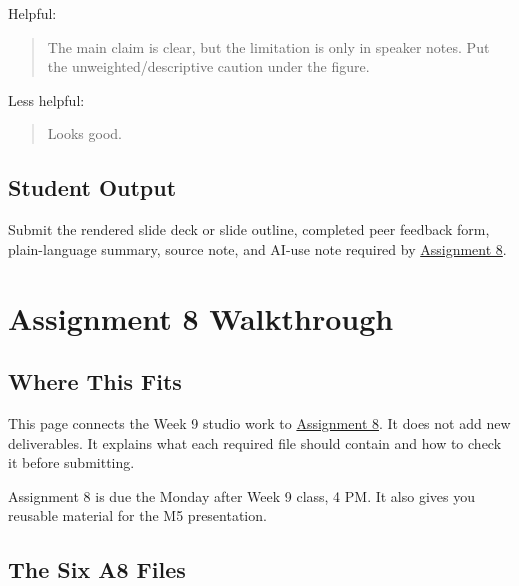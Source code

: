 \documentclass[
  letterpaper,
  DIV=11,
  numbers=noendperiod,
  oneside]{scrreprt}
\begin{document}
Helpful:

\begin{quote}
The main claim is clear, but the limitation is only in speaker notes.
Put the unweighted/descriptive caution under the figure.
\end{quote}

Less helpful:

\begin{quote}
Looks good.
\end{quote}

\section*{Student Output}\label{student-output-7}


Submit the rendered slide deck or slide outline, completed peer feedback
form, plain-language summary, source note, and AI-use note required by
\href{../../assignments/assignment08-communication/README.md}{Assignment
8}.

\chapter*{Assignment 8 Walkthrough}\label{assignment-8-walkthrough}


\section*{Where This Fits}\label{where-this-fits-20}


This page connects the Week 9 studio work to
\href{../../assignments/assignment08-communication/README.md}{Assignment
8}. It does not add new deliverables. It explains what each required
file should contain and how to check it before submitting.

Assignment 8 is due the Monday after Week 9 class, 4 PM. It also gives
you reusable material for the M5 presentation.

\section*{The Six A8 Files}\label{the-six-a8-files}
\end{document}
